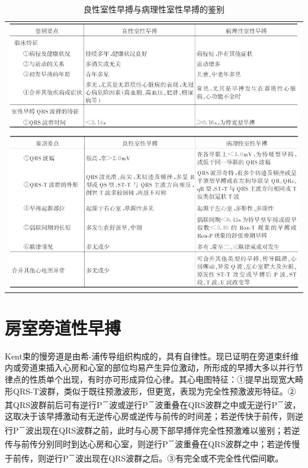 \begin{longtable}{c}
  \caption{良性室性早搏与病理性室性早搏的鉴别}
  \label{tab11-3}\\
  \endfirsthead
  \caption[]{良性室性早搏与病理性室性早搏的鉴别}
  \endhead
\includegraphics[width=\textwidth,height=\textheight,keepaspectratio]{./images/Image00191.jpg}\\
\includegraphics[width=\textwidth,height=\textheight,keepaspectratio]{./images/Image00192.jpg}
\end{longtable}

\section{房室旁道性早搏}

Kent束的慢旁道是由希-浦传导组织构成的，具有自律性。现已证明在旁道束纤维内或旁道束插入心房和心室的部位均易产生异位激动，所形成的早搏大多以并行节律点的性质单个出现，有时亦可形成异位心律。其心电图特征：①提早出现宽大畸形QRS-T波群，类似于既往预激波形，但更宽，表现为完全性预激波形特征。②其QRS波群前后可有逆行P\textsuperscript{－}波或逆行P\textsuperscript{－}波重叠在QRS波群之中或无逆行P\textsuperscript{－}波，这取决于该早搏激动有无逆传心房或逆传与前传的时间差；若逆传快于前传，则逆行P\textsuperscript{－}波出现在QRS波群之前，此时与心房下部早搏伴完全性预激难以鉴别；若逆传与前传分别同时到达心房和心室，则逆行P\textsuperscript{－}波重叠在QRS波群之中；若逆传慢于前传，则逆行P\textsuperscript{－}波出现在QRS波群之后。③有完全或不完全性代偿间歇。

